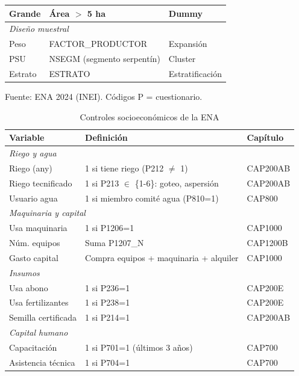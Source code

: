 \documentclass[10pt,a4paper]{article}
\begin{document}
\begin{table}[H]
\begin{threeparttable}
\begin{tabular}{p{3.2cm}p{6.5cm}p{3.8cm}}
Grande & Área $>$ 5 ha & Dummy \\
\midrule
\multicolumn{3}{l}{\textit{Diseño muestral}} \\
Peso & FACTOR\_PRODUCTOR & Expansión \\
PSU & NSEGM (segmento serpentín) & Cluster \\
Estrato & ESTRATO & Estratificación \\
\bottomrule
\end{tabular}
\begin{tablenotes}
\footnotesize
\item Fuente: ENA 2024 (INEI). Códigos P = cuestionario.
\end{tablenotes}
\end{threeparttable}
\end{table}

\begin{table}[H]
\centering
\caption{Controles socioeconómicos de la ENA}
\label{tab:control_definitions}
\begin{threeparttable}
\small
\begin{tabular}{p{3cm}p{7cm}p{2.5cm}}
\toprule
\textbf{Variable} & \textbf{Definición} & \textbf{Capítulo} \\
\midrule
\multicolumn{3}{l}{\textit{Riego y agua}} \\
Riego (any) & 1 si tiene riego (P212 $\neq$ 1) & CAP200AB \\
Riego tecnificado & 1 si P213 $\in$ \{1-6\}: goteo, aspersión & CAP200AB \\
Usuario agua & 1 si miembro comité agua (P810=1) & CAP800 \\
\midrule
\multicolumn{3}{l}{\textit{Maquinaria y capital}} \\
Usa maquinaria & 1 si P1206=1 & CAP1000 \\
Núm. equipos & Suma P1207\_N & CAP1200B \\
Gasto capital & Compra equipos + maquinaria + alquiler & CAP1000 \\
\midrule
\multicolumn{3}{l}{\textit{Insumos}} \\
Usa abono & 1 si P236=1 & CAP200E \\
Usa fertilizantes & 1 si P238=1 & CAP200E \\
Semilla certificada & 1 si P214=1 & CAP200AB \\
\midrule
\multicolumn{3}{l}{\textit{Capital humano}} \\
Capacitación & 1 si P701=1 (últimos 3 años) & CAP700 \\
Asistencia técnica & 1 si P704=1 & CAP700 \\

\end{tabular}
\end{threeparttable}
\end{table}
\end{document}
